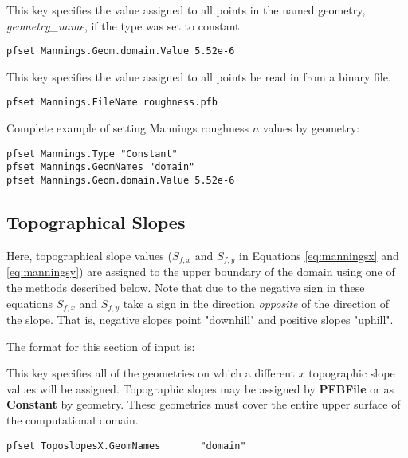 {
This key specifies the value assigned to all points in the named
geometry, {\em geometry\_name}, if the type was set to constant.
}
\begin{display}\begin{verbatim}
pfset Mannings.Geom.domain.Value 5.52e-6
\end{verbatim}\end{display}

{
This key specifies the value assigned to all points be read in from a \parflow{} binary file.
}
\begin{display}\begin{verbatim}
pfset Mannings.FileName roughness.pfb
\end{verbatim}\end{display}

Complete example of setting Mannings roughness $n$ values by geometry:
\begin{display}\begin{verbatim}
pfset Mannings.Type "Constant"
pfset Mannings.GeomNames "domain"
pfset Mannings.Geom.domain.Value 5.52e-6
\end{verbatim}\end{display}

\subsection{Topographical Slopes}
\label{Topographical Slopes}

Here, topographical slope values ($S_{f,x}$ and $S_{f,y}$ in Equations \ref{eq:manningsx} and \ref{eq:manningsy}) are assigned to the upper boundary of the domain using one of the methods described below. Note that due to the negative sign in these equations $S_{f,x}$ and $S_{f,y}$ take a sign in the direction \emph{opposite} of the direction of the slope.  That is, negative slopes point "downhill" and positive slopes "uphill".

The format for this section of input is:

{
This key specifies all of the geometries on which a different $x$ topographic slope values will be 
assigned.  Topographic slopes may be assigned by {\bf PFBFile} or as {\bf Constant} by geometry.  These geometries must cover the entire upper surface of the computational domain.
}
\begin{display}\begin{verbatim}
pfset ToposlopesX.GeomNames       "domain"
\end{verbatim}\end{display}

